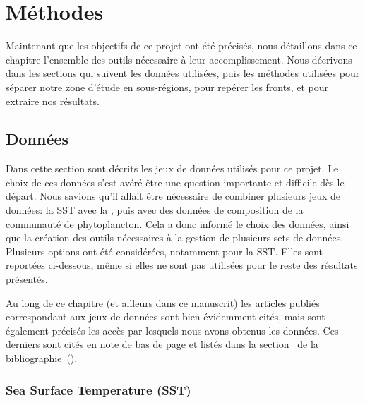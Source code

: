 
\chapter{Méthodes}
\addChpLof
\label{chp:methodes}
\graphicspath{{resources/méthodes}}

{
  \hypersetup{hidelinks}
  \minitoc%
  \clearpage
}

Maintenant que les objectifs de ce projet ont été précisés, nous détaillons dans ce chapitre l'ensemble des outils nécessaire à leur accomplissement.
Nous décrivons dans les sections qui suivent les données utilisées, puis les méthodes utilisées pour séparer notre zone d'étude en sous-régions, pour repérer les fronts, et pour extraire nos résultats.

\section{Données}
\label{sec:donnees}

Dans cette section sont décrits les jeux de données utilisés pour ce projet.
Le choix de ces données s'est avéré être une question importante et difficile dès le départ.
Nous savions qu'il allait être nécessaire de combiner plusieurs jeux de données: la SST avec la , puis avec des données de composition de la communauté de phytoplancton.
Cela a donc informé le choix des données, ainsi que la création des outils nécessaires à la gestion de plusieurs sets de données.
Plusieurs options ont été considérées, notamment pour la SST.
Elles sont reportées ci-dessous, même si elles ne sont pas utilisées pour le reste des résultats présentés.

Au long de ce chapitre (et ailleurs dans ce manuscrit) les articles publiés correspondant aux jeux de données sont bien évidemment cités, mais sont également précisés les accès par lesquels nous avons obtenus les données.
Ces derniers sont cités en note de bas de page et listés dans la section~ de la bibliographie~().

\subsection{Sea Surface Temperature (SST)}
\label{sec:donnees-sst}

